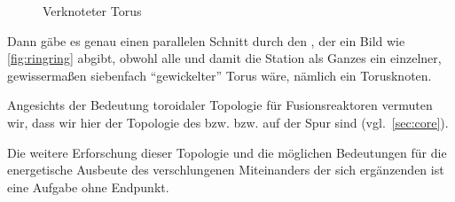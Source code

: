 \begin{figure}
    \centering
    \caption{Verknoteter Torus \cite{knottedtorus}}
    \label{fig:knottedtorus}
\end{figure}

Dann gäbe es genau einen parallelen Schnitt durch den , der ein Bild wie \cref{fig:ringring} abgibt, obwohl alle  und damit die Station als Ganzes ein einzelner, gewissermaßen siebenfach "`gewickelter"' Torus wäre, nämlich ein Torusknoten.

Angesichts der Bedeutung toroidaler Topologie für Fusionsreaktoren vermuten wir, dass wir hier der Topologie des  bzw.  bzw.   auf der Spur sind (vgl.~\cref{sec:core}). 

Die weitere Erforschung dieser Topologie und die möglichen Bedeutungen für die energetische Ausbeute des verschlungenen Miteinanders der sich ergänzenden  ist eine Aufgabe ohne Endpunkt.



    
